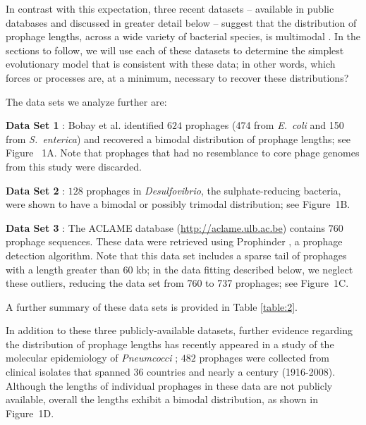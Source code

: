  In contrast with this expectation, three recent datasets -- available in public databases and discussed in greater detail below -- suggest that the distribution of prophage lengths, across a wide variety of bacterial species, is multimodal
 \citep{bobay_pervasive_2014,crispim_screening_2018,brueggemann_pneumococcal_2017,leplae_aclame:_2010}.  In the sections to follow, we will use each of these datasets to determine the simplest evolutionary model that is consistent with these data;  in other words, which forces or processes are, at a minimum, necessary to recover these distributions?
 
 The data sets we analyze further are:
 
 \textbf{Data Set 1} \citep{bobay_pervasive_2014}: Bobay et al. identified $624$ prophages  (474 from \textit{E.~coli} and 150 from \textit{S.~enterica}) and recovered a bimodal distribution of prophage lengths; see Figure~ 1A. Note that prophages that had no resemblance to core phage genomes from this study were discarded.
 
\textbf{Data Set 2} \citep{crispim_screening_2018}: $128$ prophages in \textit{Desulfovibrio}, the sulphate-reducing bacteria,  were  shown to have a bimodal or possibly trimodal distribution; see Figure~1B.

\textbf{Data Set 3} \citep{leplae_aclame:_2010}: The ACLAME database (\href{http://aclame.ulb.ac.be}{http://aclame.ulb.ac.be}) contains $760$ prophage sequences. These data were retrieved using Prophinder \citep{lima-mendez_prophinder:_2008}, a prophage detection algorithm. Note that this data set includes a sparse tail of prophages with a length greater than 60 kb; in the data fitting described below, we neglect these outliers, reducing the data set from 760 to 737 prophages; see Figure~1C.

A further summary of these data sets is provided in Table \ref{table:2}. 

In addition to these three publicly-available datasets, further evidence regarding the distribution of prophage lengths has recently appeared in  a study of the molecular epidemiology of \textit{Pneumcocci} \citep{brueggemann_pneumococcal_2017}; $482$ prophages were collected from clinical isolates that spanned 36 countries and nearly a century (1916-2008). Although the lengths of individual prophages in these data are not publicly available, overall the lengths exhibit a bimodal distribution, as shown in Figure~1D. 

